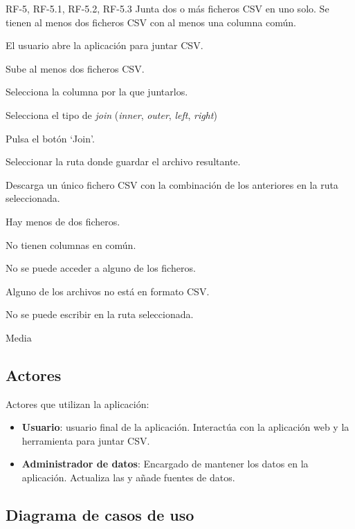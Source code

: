 
{RF-5, RF-5.1, RF-5.2, RF-5.3}
{Junta dos o más ficheros CSV en uno solo.}
{Se tienen al menos dos ficheros CSV con al menos una columna común.}
{
	\item El usuario abre la aplicación para juntar CSV.
	\item Sube al menos dos ficheros CSV.
	\item Selecciona la columna por la que juntarlos.
	\item Selecciona el tipo de \textit{join} (\textit{inner}, \textit{outer}, \textit{left}, \textit{right})
	\item Pulsa el botón `Join'.
	\item Seleccionar la ruta donde guardar el archivo resultante.
}
{Descarga un único fichero CSV con la combinación de los anteriores en la ruta seleccionada.}
{
	\item Hay menos de dos ficheros.
	\item No tienen columnas en común.
	\item No se puede acceder a alguno de los ficheros.
	\item Alguno de los archivos no está en formato CSV.
	\item No se puede escribir en la ruta seleccionada.
}
{Media}

\subsection{Actores}

Actores que utilizan la aplicación:

\begin{itemize}
	\item \textbf{Usuario}: usuario final de la aplicación. Interactúa con la aplicación web y la herramienta para juntar CSV.
	\item \textbf{Administrador de datos}: Encargado de mantener los datos en la aplicación. Actualiza las y añade fuentes de datos.
\end{itemize}

\subsection{Diagrama de casos de uso}

